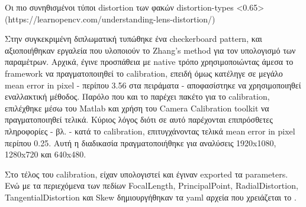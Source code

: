 %
{Οι πιο συνηθισμένοι τύποι distortion των φακών}%
{distortion-types}%
<0.65>%
(https://learnopencv.com/understanding-lens-distortion/)

Στην συγκεκριμένη διπλωματική τυπώθηκε ένα checkerboard pattern, και α\-ξιο\-ποιή\-θη\-καν εργαλεία που υλοποιούν το Zhang's method για τον υπολογισμό των πα\-ρα\-μέ\-τρων. Αρχικά, έγινε προσπάθεια με native τρόπο χρησιμοποιώντας άμεσα το framework  να πραγματοποιηθεί το calibration, επειδή όμως κατέληγε σε μεγάλο mean error in pixel - περίπου 3.56 στα πειράματα - αποφασίστηκε να χρησιμοποιηθεί εναλλακτική μέθοδος. Παρόλο που και το  παρέχει πακέτο για το calibration, επιλέχθηκε μέσω του Matlab και χρήση του Camera Calibration toolkit να πραγματοποιηθεί τελικά. Κύριος λόγος διότι σε αυτό παρέχονται επιπρόσθετες πληροφορίες - βλ.  - κατά το calibration, επιτυγχάνοντας τελικά mean error in pixel περίπου 0.25. Αυτή η διαδικασία πραγματοποιήθηκε για αναλύσεις 1920x1080, 1280x720 και 640x480. 

Στο τέλος του calibration, είχαν υπολογιστεί και έγιναν exported τα parameters. Ενώ με τα περιεχόμενα των πεδίων FocalLength, PrincipalPoint, RadialDistortion, TangentialDistortion και Skew δημιουργήθηκαν τα yaml αρχεία που χρειάζεται το  \cite{ros-calibration-instr1} \cite{ros-calibration-instr2}.


